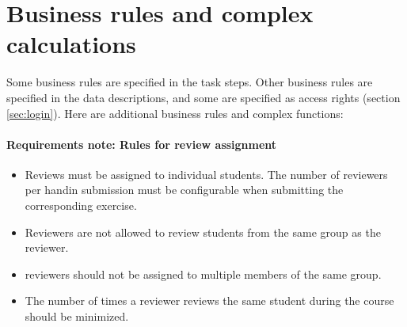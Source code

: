 \documentclass[Main]{subfiles}
\begin{document}
\section{Business rules and complex calculations}
Some business rules are specified in the task steps. 
Other business rules are specified in the data descriptions, and some are specified as access rights (section \ref{sec:login}). 
Here are additional business rules and complex functions:


\begin{FunctionTable}
\end{FunctionTable}

\paragraph{Requirements note: Rules for review assignment}\label{reqnote:reviewAssignments}
\begin{itemize}

\item Reviews must be assigned to individual students. 
The number of reviewers per handin submission must be configurable when submitting the corresponding exercise.

\item Reviewers are not allowed to review students from the same group as the reviewer.

\item reviewers should not be assigned to multiple members of the same group.

\item The number of times a reviewer reviews the same student during the course should be minimized. 

\end{itemize}
\end{document}
